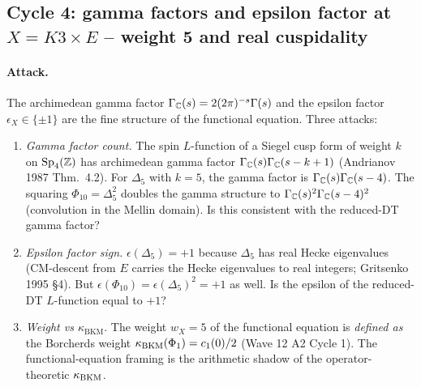 \subsection*{Cycle 4: gamma factors and epsilon factor at
$X=K3\times E$ -- weight 5 and real cuspidality}
\label{sec:w14a14-cycle-4}

\paragraph{Attack.}
The archimedean gamma factor $\Gamma_{\mathbb{C}}(s)=2(2\pi)^{-s}\Gamma(s)$
and the epsilon factor $\epsilon_X\in\{\pm 1\}$ are the
fine structure of the functional equation. Three attacks:

\begin{enumerate}[label=\textbf{O.\arabic*},leftmargin=1.5em]
\item \emph{Gamma factor count.} The spin $L$-function of a
  Siegel cusp form of weight $k$ on $\mathrm{Sp}_4(\mathbb{Z})$ has archimedean
  gamma factor $\Gamma_{\mathbb{C}}(s)\Gamma_{\mathbb{C}}(s-k+1)$ (Andrianov 1987
  Thm.\ 4.2). For $\Delta_5$ with $k=5$, the gamma factor is
  $\Gamma_{\mathbb{C}}(s)\Gamma_{\mathbb{C}}(s-4)$. The squaring
  $\Phi_{10}=\Delta_5^2$ doubles the gamma structure to
  $\Gamma_{\mathbb{C}}(s)^2\Gamma_{\mathbb{C}}(s-4)^2$ (convolution in the Mellin
  domain). Is this consistent with the reduced-DT gamma factor?
\item \emph{Epsilon factor sign.} $\epsilon(\Delta_5)=+1$ because
  $\Delta_5$ has real Hecke eigenvalues (CM-descent from $E$
  carries the Hecke eigenvalues to real integers; Gritsenko 1995
  \S4). But $\epsilon(\Phi_{10})=\epsilon(\Delta_5)^2=+1$ as
  well. Is the epsilon of the reduced-DT $L$-function equal to
  $+1$?
\item \emph{Weight vs $\kappa_{\mathrm{BKM}}$}. The weight $w_X=5$
  of the functional equation is \emph{defined as} the Borcherds
  weight $\kappa_{\mathrm{BKM}}(\Phi_1)=c_1(0)/2$ (Wave 12 A2 Cycle 1). The
  functional-equation framing is the arithmetic shadow of the
  operator-theoretic $\kappa_{\mathrm{BKM}}$.
\end{enumerate}


